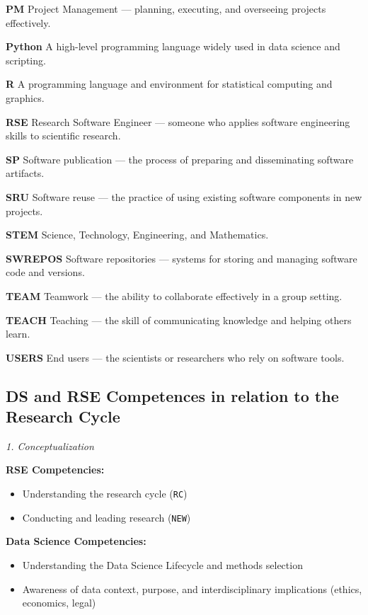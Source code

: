 \documentclass[
        english,biblatex
    ]{lni}
\providecommand{\tightlist}{%
    \setlength{\itemsep}{0pt}\setlength{\parskip}{0pt}}
\begin{document}
    \textbf{PM} Project Management --- planning, executing, and
    overseeing projects effectively.

    \textbf{Python} A high-level programming language widely used in
    data science and scripting.

    \textbf{R} A programming language and environment for statistical
    computing and graphics.

    \textbf{RSE} Research Software Engineer --- someone who applies
    software engineering skills to scientific research.

    \textbf{SP} Software publication --- the process of preparing and
    disseminating software artifacts.

    \textbf{SRU} Software reuse --- the practice of using existing
    software components in new projects.

    \textbf{STEM} Science, Technology, Engineering, and Mathematics.

    \textbf{SWREPOS} Software repositories --- systems for storing and
    managing software code and versions.

    \textbf{TEAM} Teamwork --- the ability to collaborate effectively in
    a group setting.

    \textbf{TEACH} Teaching --- the skill of communicating knowledge and
    helping others learn.

    \textbf{USERS} End users --- the scientists or researchers who rely
    on software tools.

    \subsection{DS and RSE Competences in relation to the Research
    Cycle}\label{ds-and-rse-competences-in-relation-to-the-research-cycle}

    \emph{1. Conceptualization}

    \textbf{RSE Competencies:}

    \begin{itemize}
    \tightlist
    \item
      Understanding the research cycle (\texttt{RC})
    \item
      Conducting and leading research (\texttt{NEW})
    \end{itemize}

    \textbf{Data Science Competencies:}

    \begin{itemize}
    \tightlist
    \item
      Understanding the Data Science Lifecycle and methods selection
    \item
      Awareness of data context, purpose, and interdisciplinary
      implications (ethics, economics, legal)
    \end{itemize}
\end{document}
